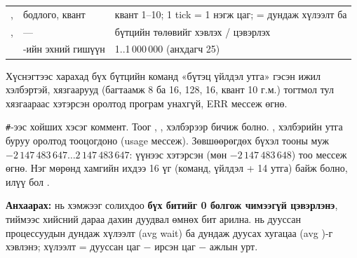 \begin{longtable}{@{}L{48mm}L{60mm}L{42mm}@{}}
\newline{},\newline{} & бодлого, квант & квант 1--10; 1 tick = 1 нэгж цаг;  = дундаж хүлээлт ба \\
,\newline{} & --- & бүтцийн төлөвийг хэвлэх / цэвэрлэх\\
\newline{} & -ийн эхний гишүүн & 1..1\,000\,000 (анхдагч 25)\\
\end{longtable}
Хүснэгтээс харахад бүх бүтцийн команд «бүтэц үйлдэл утга» гэсэн ижил хэлбэртэй, хязгаарууд (багтаамж 8 ба 16,  128,  16, квант 10 г.м.) тогтмол тул хязгаараас хэтэрсэн оролтод програм унахгүй, ERR мессеж өгнө.

\texttt{\#}-ээс хойших хэсэг коммент. Тоог , ,  хэлбэрээр бичиж болно. ,  хэлбэрийн утга буруу оролтод тооцогдоно (usage мессеж). Зөвшөөрөгдөх бүхэл тооны муж \textbf{$-2\,147\,483\,647 \ldots 2\,147\,483\,647$}: үүнээс хэтэрсэн (мөн $-2\,147\,483\,648$) тоо  мессеж өгнө. Нэг мөрөнд хамгийн ихдээ 16 үг (команд, үйлдэл + 14 утга) байж болно, илүү бол .

\textbf{Анхаарах:}  нь хэмжээг солихдоо \textbf{бүх битийг 0 болгож чимээгүй цэвэрлэнэ}, тиймээс  хийсний дараа  дахин дуудвал өмнөх бит арилна.  нь дууссан процессуудын дундаж хүлээлт (avg wait) ба дундаж дуусах хугацаа (avg )-г хэвлэнэ; хүлээлт = дууссан цаг $-$ ирсэн цаг $-$ ажлын урт.


